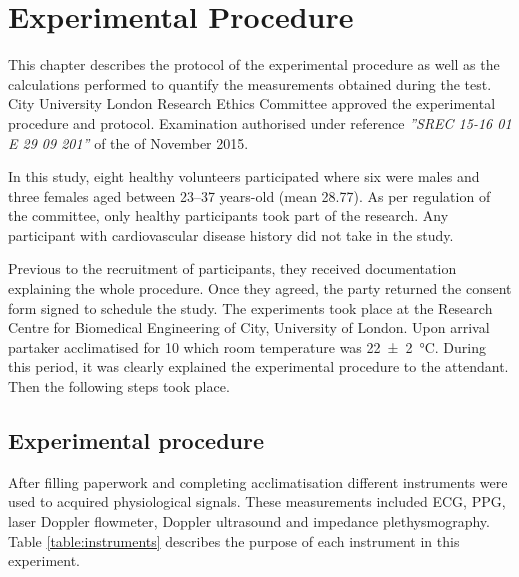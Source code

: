 
\chapter{Experimental Procedure}  %
\label{chapter procedure}

\ifpdf
    \graphicspath{{Chapter5/Figs/Raster/}{Chapter5/Figs/PDF/}{Chapter5/Figs/}}
\else
    \graphicspath{{Chapter5/Figs/Vector/}{Chapter5/Figs/}}
\fi

This chapter describes the protocol of the experimental procedure as well as the calculations performed to quantify the measurements obtained during the test. City University London Research Ethics Committee approved the experimental procedure and protocol. Examination authorised under reference \textit{''SREC 15-16 01 E 29 09 201''} of the  of November 2015. 

In this study, eight healthy volunteers participated where six were males and three females aged between \numrange{23}{37} years-old (mean 28.77). As per regulation of the committee, only healthy participants took part of the research. Any participant with cardiovascular disease history did not take in the study. 

Previous to the recruitment of participants, they received documentation explaining the whole procedure. Once they agreed, the party returned the consent form signed to schedule the study. The experiments took place at the Research Centre for Biomedical Engineering of City, University of London. Upon arrival partaker acclimatised for \SI{10}{\min} which room temperature was \SI{22(2)}{\degreeCelsius}. During this period, it was clearly explained the experimental procedure to the attendant. Then the following steps took place.


\section{Experimental procedure} %
\label{section procedure 1}

After filling paperwork and completing acclimatisation different instruments were used to acquired physiological signals. These measurements included ECG, PPG, laser Doppler flowmeter, Doppler ultrasound and impedance plethysmography. Table \ref{table:instruments} describes the purpose of each instrument in this experiment. 

